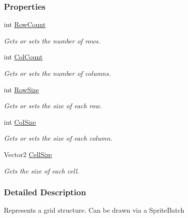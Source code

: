 \subsubsection*{Properties}
\begin{DoxyCompactItemize}
\item 
int \hyperlink{class_m_b2_d_1_1_geometry_1_1_grid_ad2599c5d630bb783ff2ba062c276be9a}{Row\+Count}
\begin{DoxyCompactList}\small\item\em Gets or sets the number of rows. \end{DoxyCompactList}\item 
int \hyperlink{class_m_b2_d_1_1_geometry_1_1_grid_a515c09f56ad55f3742b6a0eccdb15856}{Col\+Count}
\begin{DoxyCompactList}\small\item\em Gets or sets the number of columns. \end{DoxyCompactList}\item 
int \hyperlink{class_m_b2_d_1_1_geometry_1_1_grid_a38536c42bc3d3d5e58d648fd7b7f8e17}{Row\+Size}
\begin{DoxyCompactList}\small\item\em Gets or sets the size of each row. \end{DoxyCompactList}\item 
int \hyperlink{class_m_b2_d_1_1_geometry_1_1_grid_aef6e8277c73fcb160fa551836f3685da}{Col\+Size}
\begin{DoxyCompactList}\small\item\em Gets or sets the size of each column. \end{DoxyCompactList}\item 
Vector2 \hyperlink{class_m_b2_d_1_1_geometry_1_1_grid_afdee3fa9df7802b3b15aa8785621a110}{Cell\+Size}
\begin{DoxyCompactList}\small\item\em Gets the size of each cell. \end{DoxyCompactList}\end{DoxyCompactItemize}


\subsubsection{Detailed Description}
Represents a grid structure. Can be drawn via a Sprite\+Batch 



